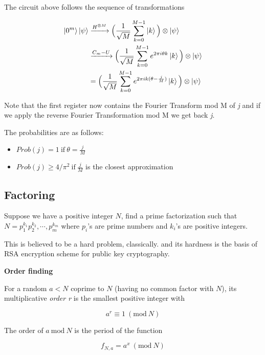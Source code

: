 \documentclass[11pt]{article}
\newcommand{\ketpsi}{\ket{\psi}}
\newcommand{\etwoi}[1]{e^{2{\pi}i{#1}}}
\begin{document}
The circuit above follows the sequence of transformations

\begin{align*}
	\ket{0^m}\ketpsi & \xrightarrow{H^{\otimes M}} \Big( \frac{1}{\sqrt{M}} \sum_{k=0}^{M-1} \ket{k} \Big) \otimes \ketpsi         \\
	                 & \xrightarrow{C_m-U} \Big( \frac{1}{\sqrt{M}} \sum_{k=0}^{M-1} \etwoi{\theta k}\ket{k} \Big) \otimes \ketpsi \\
	                 & = \Big( \frac{1}{\sqrt{M}} \sum_{k=0}^{M-1} \etwoi{k (\theta - \frac{j}{M})}\ket{k} \Big) \otimes \ketpsi   \\
\end{align*}

Note that the first register now contains the Fourier Transform mod M of \textit{j} and if we apply the reverse Fourier Transformation mod M we get back \textit{j}.

The probabilities are as follows:

\begin{itemize}
	\item{$Prob(j) = 1 \ \text{if} \ \theta = \frac{j}{M}$}
	\item{$Prob(j) \ge 4/\pi^2 \ \text{if} \ \frac{j}{M}$ is the closest approximation}
\end{itemize}

\subsection{Factoring}

Suppose we have a positive integer $N$, find a prime factorization such that $N = p_1^{k_1} p_2^{k_2}, \cdots, p_m^{k_m}$ where $p_i$'s are prime numbers and $k_i$'s are positive integers.

This is believed to be a hard problem, classically. and its hardness is the basis of RSA encryption scheme for public key cryptography.

\textbf{Order finding}

For a random $a < N$ coprime to $N$ (having no common factor with $N$), its multiplicative \textit{order r} is the smallest positive integer with


\begin{equation*}
	a^r \equiv 1 \ (\text{mod} \ N)
\end{equation*}

The order of $a \ \text{mod} \ N$ is the period of the function

\begin{equation*}
	f_{N,a} = a^x \ ( \text{mod} \ N )
\end{equation*}
\end{document}
